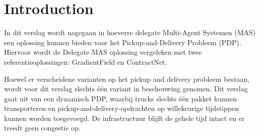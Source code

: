 \section{Introduction}
\label{sec:intro}

\par In dit verslag wordt nagegaan in hoeverre delegate Multi-Agent Systemen
(MAS) een oplossing kunnen bieden voor het Pickup-and-Delivery Probleem (PDP).
Hiervoor wordt de Delegate MAS oplossing vergeleken met twee
referentieoplossingen: GradientField en ContractNet.

\par Hoewel er verscheidene varianten op het pickup and delivery probleem
bestaan, wordt voor dit verslag slechts één variant in beschouwing genomen. Dit
verslag gaat uit van een dynamisch PDP, waarbij trucks slechts één pakket kunnen
transporteren en pickup-and-delivery-opdrachten op willekeurige tijdstippen
kunnen worden toegevoegd. De infrastructuur blijft de gehele tijd intact en er
treedt geen congestie op. 

\par 


